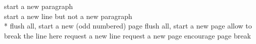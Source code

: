 start a new paragraph \\
start a new line but not a new paragraph \\*
flush all, start a new (odd numbered) page \cleardoublepage
flush all, start a new page \clearpage
allow to break the line here \linebreak
request a new line \newline
request a new page \newpage
encourage page break \pagebreak

